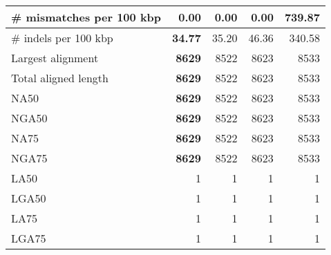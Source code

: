 \documentclass[12pt,a4paper]{article}
\begin{document}
\begin{table}[ht]
\begin{center}
\begin{tabular}{|l*{4}{|r}|}
\# mismatches per 100 kbp & {\bf 0.00} & {\bf 0.00} & {\bf 0.00} & 739.87 \\ \hline
\# indels per 100 kbp & {\bf 34.77} & 35.20 & 46.36 & 340.58 \\ \hline
Largest alignment & {\bf 8629} & 8522 & 8623 & 8533 \\ \hline
Total aligned length & {\bf 8629} & 8522 & 8623 & 8533 \\ \hline
NA50 & {\bf 8629} & 8522 & 8623 & 8533 \\ \hline
NGA50 & {\bf 8629} & 8522 & 8623 & 8533 \\ \hline
NA75 & {\bf 8629} & 8522 & 8623 & 8533 \\ \hline
NGA75 & {\bf 8629} & 8522 & 8623 & 8533 \\ \hline
LA50 & 1 & 1 & 1 & 1 \\ \hline
LGA50 & 1 & 1 & 1 & 1 \\ \hline
LA75 & 1 & 1 & 1 & 1 \\ \hline
LGA75 & 1 & 1 & 1 & 1 \\ \hline
\end{tabular}
\end{center}
\end{table}
\end{document}
